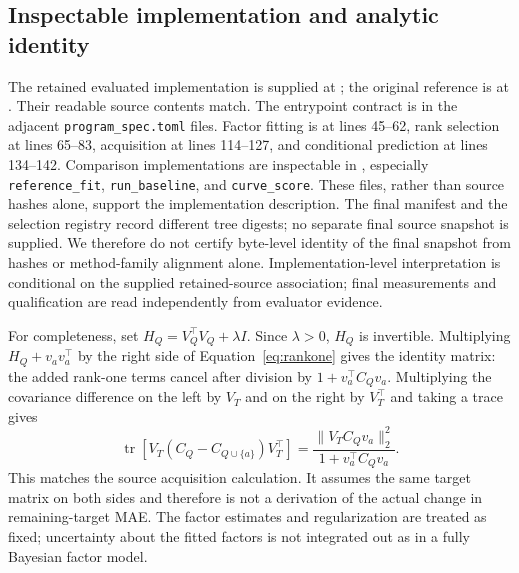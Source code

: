 \documentclass{article}
\begin{document}
\subsection{Inspectable implementation and analytic identity}
The retained evaluated implementation is supplied at
; the original reference is at
.
Their readable source contents match. The entrypoint contract is in the adjacent \texttt{program\_spec.toml} files. Factor fitting is at lines 45--62, rank selection at lines 65--83, acquisition at lines 114--127, and conditional prediction at lines 134--142. Comparison implementations are inspectable in , especially \texttt{reference\_fit}, \texttt{run\_baseline}, and \texttt{curve\_score}. These files, rather than source hashes alone, support the implementation description. The final manifest and the selection registry record different tree digests; no separate final source snapshot is supplied. We therefore do not certify byte-level identity of the final snapshot from hashes or method-family alignment alone. Implementation-level interpretation is conditional on the supplied retained-source association; final measurements and qualification are read independently from evaluator evidence.

For completeness, set $H_Q=V_Q^\top V_Q+\lambda I$. Since $\lambda>0$, $H_Q$ is invertible. Multiplying $H_Q+v_av_a^\top$ by the right side of Equation~\ref{eq:rankone} gives the identity matrix: the added rank-one terms cancel after division by $1+v_a^\top C_Qv_a$. Multiplying the covariance difference on the left by $V_T$ and on the right by $V_T^\top$ and taking a trace gives
\[
 \operatorname{tr}\!\left[V_T(C_Q-C_{Q\cup\{a\}})V_T^\top\right]
 =\frac{\|V_TC_Qv_a\|_2^2}{1+v_a^\top C_Qv_a}.
\]
This matches the source acquisition calculation. It assumes the same target matrix on both sides and therefore is not a derivation of the actual change in remaining-target MAE. The factor estimates and regularization are treated as fixed; uncertainty about the fitted factors is not integrated out as in a fully Bayesian factor model.
\end{document}
